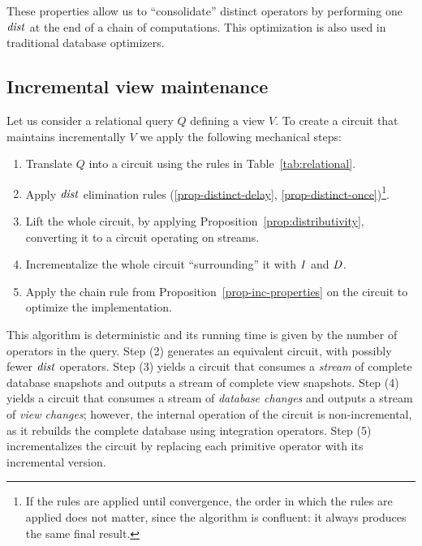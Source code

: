 These properties allow us to ``consolidate'' distinct operators by
performing one $\mathit{dist}$ at the end of a chain of computations.
This optimization is also used in traditional database optimizers.

\subsection{Incremental view maintenance}

Let us consider a relational query $Q$ defining a view $V$.  To create
a circuit that maintains incrementally $V$ we apply the following
mechanical steps:

\begin{algorithm}%
  \label{algorithm-inc}\quad
\begin{enumerate}[nosep, leftmargin=\parindent]
    \item Translate $Q$ into a circuit using the rules in Table~\ref{tab:relational}.
    \item Apply $\mathit{dist}$ elimination rules
      (\ref{prop-distinct-delay},
      \ref{prop-distinct-once})\footnote{If the rules are applied
      until convergence, the order in which the rules
      are applied does not matter, since the algorithm is confluent:
      it always produces the same final result.}.
    \item Lift the whole circuit, by applying Proposition~\ref{prop:distributivity},
    converting it to a circuit operating on streams.
    \item Incrementalize the whole circuit ``surrounding'' it with $\mathit{I}$ and $\mathit{D}$.
    \item Apply the chain rule from
      Proposition~\ref{prop-inc-properties} on the circuit to optimize
      the implementation.
\end{enumerate}
\end{algorithm}

This algorithm is deterministic and its running time
is given by the number of operators in the query.
Step (2) generates an equivalent circuit, with possibly fewer
$\mathit{dist}$ operators.  Step (3) yields a circuit that consumes a
\emph{stream} of complete database snapshots and outputs a stream of
complete view snapshots. Step (4) yields a circuit that consumes a
stream of \emph{database changes} and outputs a stream of \emph{view
changes}; however, the internal operation of the circuit is
non-incremental, as it rebuilds the complete database using
integration operators.  Step (5) incrementalizes the circuit by
replacing each primitive operator with its incremental version.

